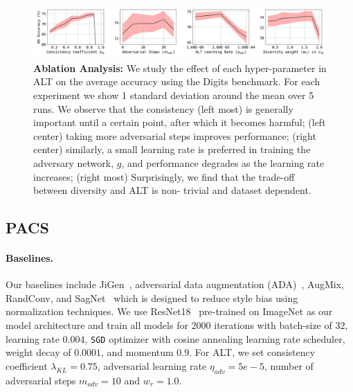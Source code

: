 \begin{figure}
    \centering
    \includegraphics[width=\linewidth]{alt/figures/digits_hyperparam.png}
    \caption{\small{\textbf{Ablation Analysis:} We study the effect of each hyper-parameter in ALT on the average accuracy using the Digits benchmark. For each experiment we show 1 standard deviation around the mean over 5 runs. We observe that the consistency (left most) is generally important until a certain point, after which it becomes harmful; (left center) taking more adversarial steps improves performance; (right center) similarly, a small learning rate is preferred in training the adversary network, $g$, and performance degrades as the learning rate increases; (right most) Surprisingly, we find that the trade-off between diversity and ALT is non- trivial and dataset dependent.}}
    \label{fig:digits_hp}
\end{figure}


\subsection{PACS}
\paragraph{Baselines.}
Our baselines include JiGen~\citep{carlucci2019domain}, adversarial data augmentation (ADA)~\citep{volpi2018generalizing}, AugMix, RandConv, and SagNet~\citep{nam2021reducing} which is designed to reduce style bias using normalization techniques.
We use ResNet18~\citep{he2016deep} pre-trained on ImageNet as our model architecture and train all models for $2000$ iterations with batch-size of $32$, learning rate $0.004$, \texttt{SGD} optimizer with cosine annealing learning rate scheduler, weight decay of $0.0001$, and momentum $0.9$.
For ALT, we set consistency coefficient $\lambda_{KL}{=}0.75$, adversarial learning rate $\eta_{adv}{=}5e{-}5$, number of adversarial steps $m_{adv}{=}10$ and $w_r{=}1.0$.

